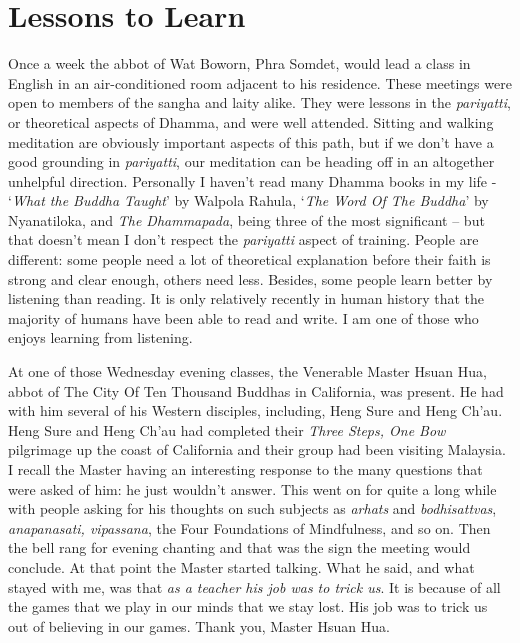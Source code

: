 \chapter{Lessons to Learn}

Once a week the abbot of Wat Boworn, Phra Somdet, would lead a class in
English in an air-conditioned room adjacent to his residence. These
meetings were open to members of the sangha and laity alike. They were
lessons in the \emph{pariyatti}, or theoretical aspects of Dhamma, and
were well attended. Sitting and walking meditation are obviously
important aspects of this path, but if we don't have a good grounding in
\emph{pariyatti}, our meditation can be heading off in an altogether
unhelpful direction. Personally I haven't read many Dhamma books in my
life - `\emph{What the Buddha Taught}' by Walpola Rahula,
`\emph{The Word Of The Buddha}' by Nyanatiloka, and \emph{The Dhammapada}\cite{dhammapada},
being three of the most significant -- but that
doesn't mean I don't respect the \emph{pariyatti} aspect of training. People
are different: some people need a lot of theoretical explanation before
their faith is strong and clear enough, others need less. Besides, some
people learn better by listening than reading. It is only relatively
recently in human history that the majority of humans have been able to
read and write. I am one of those who enjoys learning from listening.

At one of those Wednesday evening classes, the Venerable Master Hsuan
Hua, abbot of The City Of Ten Thousand Buddhas in California, was
present. He had with him several of his Western disciples, including,
Heng Sure and Heng Ch'au. Heng Sure and Heng Ch'au had completed their
\emph{Three Steps, One Bow}\cite{steps} pilgrimage up the coast of California and
their group had been visiting Malaysia. I recall the Master having an
interesting response to the many questions that were asked of him: he
just wouldn't answer. This went on for quite a long while with people
asking for his thoughts on such subjects as \emph{arhats} and
\emph{bodhisattvas}, \emph{anapanasati, vipassana}, the Four Foundations
of Mindfulness, and so on. Then the bell rang for evening chanting and
that was the sign the meeting would conclude. At that point the Master
started talking. What he said, and what stayed with me, was that
\emph{as a teacher his job was to trick us}. It is because of all the
games that we play in our minds that we stay lost. His job was to trick
us out of believing in our games. Thank you, Master Hsuan Hua.


